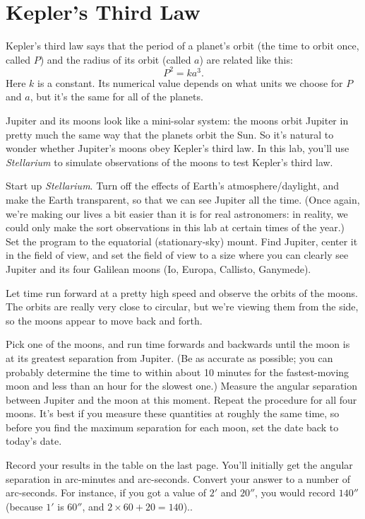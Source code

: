 \section{Kepler's Third Law}

\makelabheader

\answerspace{1in}

Kepler's third law says that the period of a planet's orbit
(the time to orbit once, called $P$) and the radius
of its orbit (called $a$) are related like this:
$$
P^2=ka^3.
$$
Here $k$ is a constant.  Its numerical value depends on what units
we choose for $P$ and $a$, but it's the same for all of the planets.

Jupiter and its moons look like a mini-solar system: the moons orbit
Jupiter in pretty much the same way that the planets orbit the Sun.
So it's natural to wonder whether Jupiter's moons obey Kepler's third
law.  In this lab, you'll use 
{\it Stellarium} to simulate
observations of the moons to test Kepler's third law.

Start up \textit{Stellarium}. Turn off the effects of Earth's
atmosphere/daylight, and make the Earth transparent, so that we can see
Jupiter all the time. (Once again, we're making our lives a bit easier than
it is for real astronomers: in reality, we could only make
the sort observations in this lab at certain times of the year.)
Set the program to the equatorial (stationary-sky) mount.
Find Jupiter, center it in the field
of view, and set the field of view to a size where you can clearly 
see Jupiter and its four Galilean moons (Io, Europa, Callisto, Ganymede).

Let time run forward at a pretty high speed and observe the orbits of 
the moons.  The orbits are really very close to circular, but we're
viewing them from the side, so the moons appear to move back and forth.

Pick one of the moons, and run time forwards and backwards until the
moon is at its greatest separation from Jupiter.  (Be as accurate as
possible; you can probably determine the time to within about 10 minutes
for the fastest-moving moon and less than an hour for the slowest one.)
Measure the angular separation between Jupiter and the moon at this moment.
Repeat the procedure for all four moons. It's best if you measure these
quantities at roughly the same time, so before you find the maximum
separation for each moon, set the date back to today's date.

Record your results in the table
on the last page.  
You'll initially get the angular separation
in arc-minutes and arc-seconds.  Convert your answer to a number of 
arc-seconds.  For instance, if you got a value of $2'$ and $20''$, you
would record $140''$ (because $1'$ is $60''$, and $2\times 60+20=140$)..

